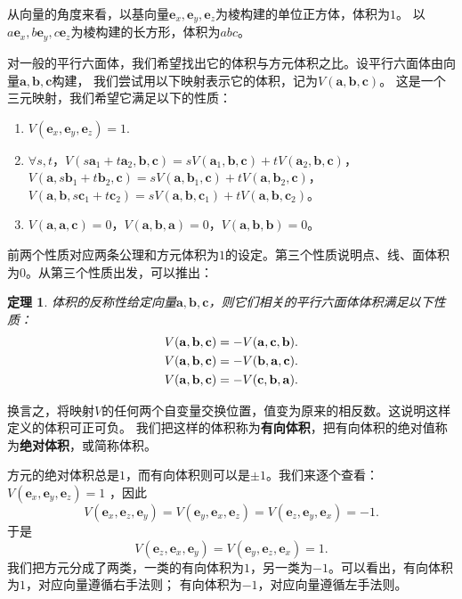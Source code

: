 \documentclass[12pt,UTF8]{ctexbook}
\newtheorem{tm}{定理}[section]
\begin{document}
从向量的角度来看，以基向量$\mathbf{e}_x, \mathbf{e}_y, \mathbf{e}_z$为棱构建的单位正方体，体积为$1$。
以$a\mathbf{e}_x, b\mathbf{e}_y, c\mathbf{e}_z$为棱构建的长方形，体积为$abc$。

对一般的平行六面体，我们希望找出它的体积与方元体积之比。设平行六面体由向量$\mathbf{a},\mathbf{b},\mathbf{c}$构建，
我们尝试用以下映射表示它的体积，记为$V(\mathbf{a},\mathbf{b},\mathbf{c})$。
这是一个三元映射，我们希望它满足以下的性质：
\begin{enumerate}
    \item $V(\mathbf{e}_x, \mathbf{e}_y, \mathbf{e}_z) = 1.$ 
    \item $\forall s,t$，$V(s\mathbf{a}_1+t\mathbf{a}_2,\mathbf{b},\mathbf{c}) = sV(\mathbf{a}_1,\mathbf{b},\mathbf{c})+tV(\mathbf{a}_2,\mathbf{b},\mathbf{c})$，$V(\mathbf{a},s\mathbf{b}_1+t\mathbf{b}_2,\mathbf{c}) = sV(\mathbf{a},\mathbf{b}_1,\mathbf{c})+tV(\mathbf{a},\mathbf{b}_2,\mathbf{c})$，$V(\mathbf{a},\mathbf{b},s\mathbf{c}_1+t\mathbf{c}_2) = sV(\mathbf{a},\mathbf{b},\mathbf{c}_1)+tV(\mathbf{a},\mathbf{b},\mathbf{c}_2)$。
    \item $V(\mathbf{a},\mathbf{a},\mathbf{c}) = 0$，$V(\mathbf{a},\mathbf{b},\mathbf{a})=0$，$V(\mathbf{a},\mathbf{b},\mathbf{b})=0$。
\end{enumerate}
前两个性质对应两条公理和方元体积为$1$的设定。第三个性质说明点、线、面体积为$0$。从第三个性质出发，可以推出：
\begin{tm}{体积的反称性}\label{tm:3-0-0}
    给定向量$\mathbf{a},\mathbf{b},\mathbf{c}$，则它们相关的平行六面体体积满足以下性质：
    \begin{align}
        V(\mathbf{a},\mathbf{b},\mathbf{c}) &= -V(\mathbf{a},\mathbf{c},\mathbf{b}). \notag \\
        V(\mathbf{a},\mathbf{b},\mathbf{c}) &= -V(\mathbf{b},\mathbf{a},\mathbf{c}). \notag \\
        V(\mathbf{a},\mathbf{b},\mathbf{c}) &= -V(\mathbf{c},\mathbf{b},\mathbf{a}). \notag 
    \end{align}
\end{tm}
换言之，将映射$V$的任何两个自变量交换位置，值变为原来的相反数。这说明这样定义的体积可正可负。
我们把这样的体积称为\textbf{有向体积}，把有向体积的绝对值称为\textbf{绝对体积}，或简称体积。

方元的绝对体积总是$1$，而有向体积则可以是$\pm 1$。我们来逐个查看：
$V(\mathbf{e}_x, \mathbf{e}_y, \mathbf{e}_z) = 1$ ，因此
$$ V(\mathbf{e}_x, \mathbf{e}_z, \mathbf{e}_y) = V(\mathbf{e}_y, \mathbf{e}_x, \mathbf{e}_z)  = V(\mathbf{e}_z, \mathbf{e}_y, \mathbf{e}_x)  = -1.$$
于是
$$ V(\mathbf{e}_z, \mathbf{e}_x, \mathbf{e}_y) = V(\mathbf{e}_y, \mathbf{e}_z, \mathbf{e}_x)   = 1.$$
我们把方元分成了两类，一类的有向体积为$1$，另一类为$-1$。可以看出，有向体积为$1$，对应向量遵循右手法则；
有向体积为$-1$，对应向量遵循左手法则。
\end{document}
